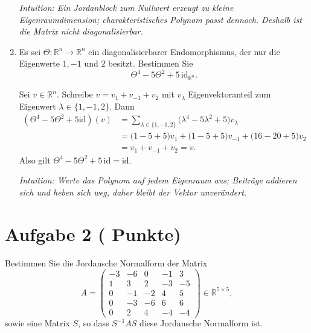 \documentclass[11pt, a4paper]{article}
\newcommand{\aufgabe}[2]{%
  \section*{\Large\bfseries Aufgabe #1%
  \if\relax\detokenize{#2}\relax\else \hfill\normalfont\normalsize(#2 Punkte)\fi}%
  \vspace{-1.5ex}
}
\begin{document}
\begin{enumerate}
\begin{framed}
  \medskip\noindent\textit{Intuition: Ein Jordanblock zum Nullwert erzeugt zu kleine Eigenraumdimension; charakteristisches Polynom passt dennoch. Deshalb ist die Matrix nicht diagonalisierbar.}
  \end{framed}

  \item Es sei $\Theta:\mathbb{R}^n\to\mathbb{R}^n$ ein diagonalisierbarer Endomorphismus, der nur die Eigenwerte $1,-1$ und $2$ besitzt. Bestimmen Sie
  \[
    \Theta^4-5\Theta^2+5\,\mathrm{id}_{\mathbb{R}^n}.
  \]
  \begin{framed}
  Sei $v\in\mathbb{R}^n$. Schreibe $v=v_{1}+v_{-1}+v_{2}$ mit
  $v_\lambda$ Eigenvektoranteil zum Eigenwert $\lambda\in\{1,-1,2\}$. Dann
  \[
  \begin{aligned}
    (\Theta^4-5\Theta^2+5\mathrm{id})(v)
      &=\sum_{\lambda\in\{1,-1,2\}}\big(\lambda^4-5\lambda^2+5\big)v_\lambda\\
      &=\big(1-5+5\big)v_1+\big(1-5+5\big)v_{-1}
        +\big(16-20+5\big)v_2\\
      &=v_1+v_{-1}+v_2=v.
  \end{aligned}
  \]
  Also gilt $\Theta^4-5\Theta^2+5\,\mathrm{id}=\mathrm{id}$.

  \medskip\noindent\textit{Intuition: Werte das Polynom auf jedem Eigenraum aus; Beiträge addieren sich und heben sich weg, daher bleibt der Vektor unverändert.}
  \end{framed}
\end{enumerate}

\aufgabe{2}{}
Bestimmen Sie die Jordansche Normalform der Matrix
\[
A=
\begin{pmatrix}
-3 & -6 & 0 & -1 & 3\\
 1 &  3 & 2 & -3 & -5\\
 0 & -1 & -2 &  4 & 5\\
 0 & -3 & -6 &  6 & 6\\
 0 &  2 & 4 & -4 & -4
\end{pmatrix}\in\mathbb{R}^{5\times 5},
\]
sowie eine Matrix $S$, so dass $S^{-1}AS$ diese Jordansche Normalform ist.
\begin{framed}\end{framed}
\end{document}
